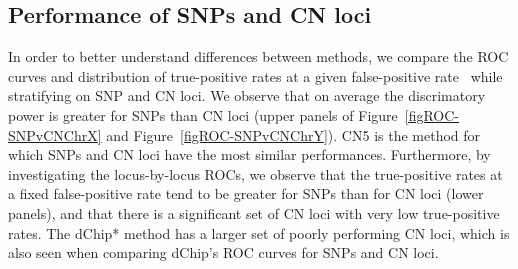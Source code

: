 \documentclass{bioinfo}
\newcommand{\TPrates}{true-positive rates\xspace}
\newcommand{\FPrate}{false-positive rate\xspace}
\begin{document}
\subsection{Performance of SNPs and CN loci}
In order to better understand differences between methods, we compare the ROC curves and distribution of \TPrates at a given \FPrate~\citep{BengtssonH_etal_2008} while stratifying on SNP and CN loci.
We observe that on average the discrimatory power is greater for SNPs than CN loci (upper panels of Figure~\ref{figROC-SNPvCNChrX} and Figure~\ref{figROC-SNPvCNChrY}).  CN5 is the method for which SNPs and CN loci have the most similar performances.   Furthermore, by investigating the locus-by-locus ROCs, we observe that the \TPrates at a fixed \FPrate tend to be greater for SNPs than for CN loci (lower panels), and that there is a significant set of CN loci with very low \TPrates.  The dChip* method has a larger set of poorly performing CN loci, which is also seen when comparing dChip's ROC curves for SNPs and CN loci.  
\end{document}

